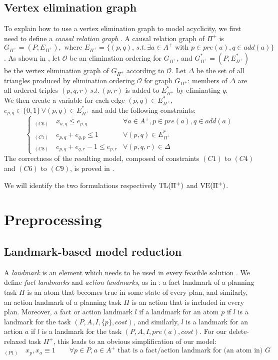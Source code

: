 \subsection{Vertex elimination graph}
To explain how to use a vertex elimination graph to model acyclicity, we first need to define a \textit{causal relation graph} \cite{Rankooh_22_2}.
A causal relation graph of $\Pi^+$ is $G_{\Pi^+}=(P,E_{\Pi^+}),\mbox{ where }E_{\Pi^+}=\{(p,q),\,s.t.\,\exists a\in A^+\mbox{ with }p\in pre(a),q\in add(a)\}$.
As shown in \cite{Rankooh_22}, let $\mathcal{O}$ be an elimination ordering for $G_{\Pi^+}$, and $G^*_{\Pi^+}=(P,E^*_{\Pi^+})$ be the vertex elimination graph of $G_{\Pi^+}$ according to $\mathcal{O}$. Let $\Delta$ be the set of all triangles produced by elimination ordering $\mathcal{O}$ for graph $G_{\Pi^+}$: members of $\Delta$ are all ordered triples $(p,q,r)\,s.t.\,(p,r)$ is added to $E^*_{\Pi^+}$ by eliminating $q$.\\
We then create a variable for each edge $(p,q)\in E^*_{\Pi^+}$, $e_{p,q}\in\{0,1\}\,\forall (p,q)\in E^*_{\Pi^+}$ and add the following constraints:
$$
\begin{cases}
    _{(C6)}\quad x_{a,q}\leq e_{p,q}&\forall a\in A^+,p\in pre(a),q\in add(a)\\
    _{(C7)}\quad e_{p,q}+e_{q,p}\leq 1&\forall(p,q)\in E^*_{\Pi^+}\\
    _{(C8)}\quad e_{p,q}+e_{q,r}-1\leq e_{p,r}&\forall(p,q,r)\in\Delta
\end{cases}
$$
The correctness of the resulting model, composed of constraints $(C1)$ to $(C4)$ and $(C6)$ to $(C9)$, is proved in \cite{Rankooh_22}.

We will identify the two formulations respectively $\mbox{TL}(\Pi^+)$ and $\mbox{VE}(\Pi^+)$.

\section{Preprocessing}
\subsection{Landmark-based model reduction}
A \textit{landmark} is an element which needs to be used in every feasible solution \cite{Hoffman_04}. We define \textit{fact landmarks} and \textit{action landmarks}, as in \cite{Gefen_12}: a fact landmark of a planning task $\Pi$ is an atom that becomes true in some state of every plan, and similarly, an action landmark of a planning task $\Pi$ is an action that is included in every plan. Moreover, a fact or action landmark $l$ if a landmark for an atom $p$ if $l$ is a landmark for the task $(P,A,I,\{p\},cost)$, and similarly, $l$ is a landmark for an action $a$ if $l$ is a landmark for the task $(P,A,I,pre(a),cost)$.
For our delete-relaxed task $\Pi^+$, this leads to an obvious simplification of our model:
$$_{(P1)}\quad x_p,x_a\equiv1\qquad\forall p\in P,a\in A^+\mbox{ that is a fact/action landmark for (an atom in) }G$$


